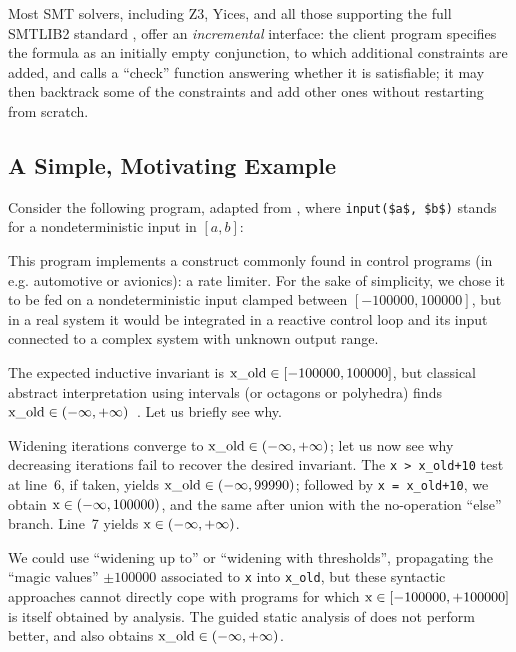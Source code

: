 \documentclass{llncs}
\newcommand{\avirer}[1]{{\color{red} #1}}
\newcommand{\avirer}[1]{}
\begin{document}
\avirer{
Most SMT solvers, including Z3,
Yices,
and all those supporting the full SMTLIB2 standard \cite{BarST-SMTLIB},
offer an \emph{incremental} interface: the client program specifies the formula as an initially empty conjunction, to which additional constraints are added, and calls a ``check'' function answering whether it is satisfiable; 
it may then backtrack some of the constraints and add other ones without restarting from scratch.
}

\subsection{A Simple, Motivating Example}
\label{subsec:rate_lim}
Consider the following program, adapted from \cite{Monniaux_Gonnord_SAS11}, where \lstinline|input($a$, $b$)| stands for a nondeterministic input in $[a,b]$:

This program implements a construct commonly found in control programs (in e.g.
automotive or avionics): a rate limiter.
\avirer{For the sake of simplicity, we chose it
to be fed on a nondeterministic input clamped between $[-100000,100000]$, but in a real system it would be integrated in a reactive control loop and its input connected to a complex system with unknown output range.}

The expected inductive invariant is $\lstinline|x_old| \in [-100000,100000]$, but classical abstract interpretation using intervals (or octagons or polyhedra) finds $\lstinline|x_old| \in (-\infty,+\infty)$~\cite{ASTREE_ESOP05}.
Let us briefly see why.

Widening iterations converge to $\lstinline|x_old| \in (-\infty,+\infty)$; let us now see why decreasing iterations fail to recover the desired invariant.
The \lstinline|x > x_old+10| test at line~6, if taken, yields $\lstinline|x_old|
\in (-\infty,99990)$; followed by \lstinline|x = x_old+10|, we obtain
$\lstinline|x| \in (-\infty,\allowbreak 100000)$, and the same after union with the no-operation ``else'' branch. Line~7 yields $\lstinline|x| \in (-\infty,+\infty)$.

We could use ``widening up to'' or ``widening with thresholds'', propagating the ``magic values'' $\pm 100000$ associated to \lstinline|x| into \mbox{\lstinline|x_old|,} but these syntactic approaches cannot directly cope with programs for which $\lstinline|x|  \in [-100000,+100000]$ is itself obtained by analysis.
The guided static analysis of \cite{DBLP:conf/sas/GopanR07} does not perform
better, and also obtains $\lstinline|x_old| \in (-\infty,+\infty)$.
\end{document}

